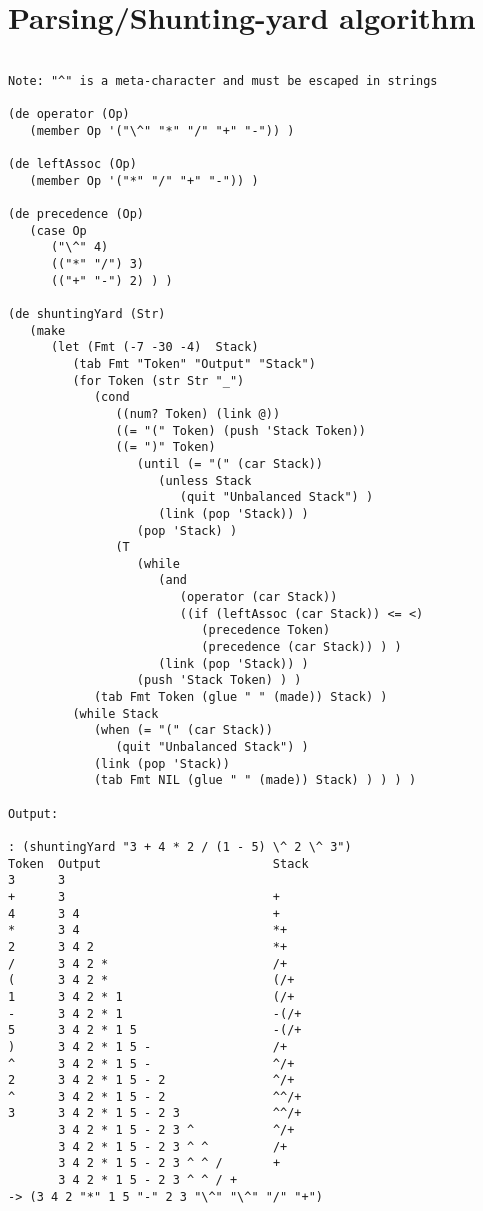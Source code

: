 \section*{Parsing/Shunting-yard algorithm}

\begin{verbatim}

Note: "^" is a meta-character and must be escaped in strings

(de operator (Op)
   (member Op '("\^" "*" "/" "+" "-")) )

(de leftAssoc (Op)
   (member Op '("*" "/" "+" "-")) )

(de precedence (Op)
   (case Op
      ("\^" 4)
      (("*" "/") 3)
      (("+" "-") 2) ) )

(de shuntingYard (Str)
   (make
      (let (Fmt (-7 -30 -4)  Stack)
         (tab Fmt "Token" "Output" "Stack")
         (for Token (str Str "_")
            (cond
               ((num? Token) (link @))
               ((= "(" Token) (push 'Stack Token))
               ((= ")" Token)
                  (until (= "(" (car Stack))
                     (unless Stack
                        (quit "Unbalanced Stack") )
                     (link (pop 'Stack)) )
                  (pop 'Stack) )
               (T
                  (while
                     (and
                        (operator (car Stack))
                        ((if (leftAssoc (car Stack)) <= <)
                           (precedence Token)
                           (precedence (car Stack)) ) )
                     (link (pop 'Stack)) )
                  (push 'Stack Token) ) )
            (tab Fmt Token (glue " " (made)) Stack) )
         (while Stack
            (when (= "(" (car Stack))
               (quit "Unbalanced Stack") )
            (link (pop 'Stack))
            (tab Fmt NIL (glue " " (made)) Stack) ) ) ) )

Output:

: (shuntingYard "3 + 4 * 2 / (1 - 5) \^ 2 \^ 3")
Token  Output                        Stack
3      3
+      3                             +
4      3 4                           +
*      3 4                           *+
2      3 4 2                         *+
/      3 4 2 *                       /+
(      3 4 2 *                       (/+
1      3 4 2 * 1                     (/+
-      3 4 2 * 1                     -(/+
5      3 4 2 * 1 5                   -(/+
)      3 4 2 * 1 5 -                 /+
^      3 4 2 * 1 5 -                 ^/+
2      3 4 2 * 1 5 - 2               ^/+
^      3 4 2 * 1 5 - 2               ^^/+
3      3 4 2 * 1 5 - 2 3             ^^/+
       3 4 2 * 1 5 - 2 3 ^           ^/+
       3 4 2 * 1 5 - 2 3 ^ ^         /+
       3 4 2 * 1 5 - 2 3 ^ ^ /       +
       3 4 2 * 1 5 - 2 3 ^ ^ / +
-> (3 4 2 "*" 1 5 "-" 2 3 "\^" "\^" "/" "+")

\end{verbatim}

